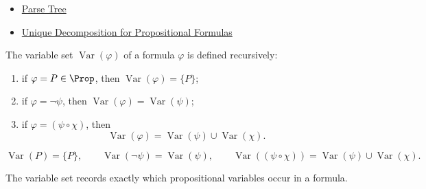 \begin{dependencies}
\begin{itemize}
  \item \hyperref[def:parse-tree-propositional-logic]{Parse Tree}
  \item \hyperref[thm:unique-decomposition-propositional-formulas]{Unique Decomposition for Propositional Formulas}
\end{itemize}
\end{dependencies}
\begin{tcolorbox}[colback=propbox, colframe=propborder, arc=2pt,
  left=6pt, right=6pt, top=4pt, bottom=4pt,
  title={\small\textbf{Definition (Variable Set of a Formula)}},
  fonttitle=\small\bfseries]
\begin{definition}
\label{def:formula-variable-set-propositional-logic}
The variable set \(\operatorname{Var}(\varphi)\) of a formula \(\varphi\) is defined recursively:
\begin{enumerate}
\item if \(\varphi=P\in\Prop\), then \(\operatorname{Var}(\varphi)=\{P\}\);
\item if \(\varphi=\neg\psi\), then \(\operatorname{Var}(\varphi)=\operatorname{Var}(\psi)\);
\item if \(\varphi=(\psi\circ\chi)\), then
\[
\operatorname{Var}(\varphi)=\operatorname{Var}(\psi)\cup\operatorname{Var}(\chi).
\]
\end{enumerate}
\end{definition}
\end{tcolorbox}

\begin{remark*}
\[
\operatorname{Var}(P)=\{P\},\qquad
\operatorname{Var}(\neg\psi)=\operatorname{Var}(\psi),\qquad
\operatorname{Var}((\psi\circ\chi))=\operatorname{Var}(\psi)\cup\operatorname{Var}(\chi).
\]
\end{remark*}

\begin{remark*}[Interpretation]
The variable set records exactly which propositional variables occur in a formula.
\end{remark*}

